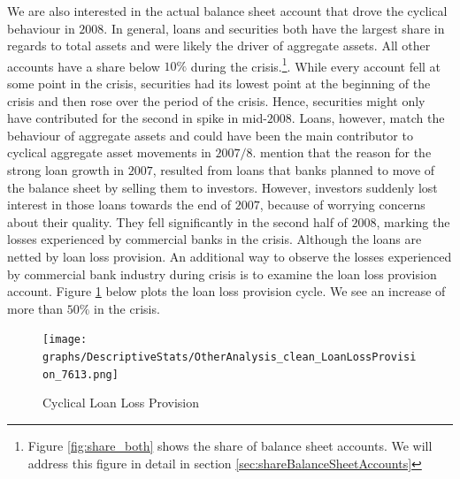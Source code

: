 \documentclass[12pt, a4paper]{article} %
\begin{document}

We are also interested in the actual balance sheet account that drove the cyclical behaviour in $2008$. In general, loans and securities both have the largest share in regards to total assets and were likely the driver of aggregate assets. All other accounts have a share below $10\%$ during the crisis.\footnote{Figure \ref{fig:share_both} shows the share of balance sheet accounts. We will address this figure in detail in section \ref{sec:shareBalanceSheetAccounts}}. While every account fell at some point in the crisis, securities had its lowest point at the beginning of the crisis and then rose over the period of the crisis. Hence, securities might only have contributed for the second in spike in mid-$2008$. Loans, however, match the behaviour of aggregate assets and could have been the main contributor to cyclical aggregate asset movements in $2007/8$. \citet{bassett2008profits} mention that the reason for the strong loan growth in $2007$, resulted from loans that banks planned to move of the balance sheet by selling them to investors. However, investors suddenly lost interest in those loans towards the end of $2007$, because of worrying concerns about their quality. 
They fell significantly in the second half of $2008$, marking the losses experienced by commercial banks in the crisis.
Although the loans are netted by loan loss provision. An additional way to observe the losses experienced by commercial bank industry during crisis is to examine the loan loss provision account. Figure \ref{fig:loan_loss_provision} below plots the loan loss provision cycle. We see an increase of more than $50\%$ in the crisis.

\begin{figure}[H]
\begin{minipage}{\textwidth}
\texttt{[image: graphs/DescriptiveStats/OtherAnalysis\_clean\_LoanLossProvision\_7613.png]}
\caption[1]{Cyclical Loan Loss Provision}
\label{fig:loan_loss_provision}
\end{minipage}
\end{figure}
\end{document}
